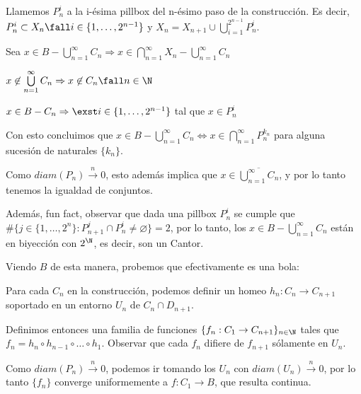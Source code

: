 
Llamemos $P_n^i$ a la i-ésima pillbox del n-ésimo paso de la construcción. Es decir, $P_n^i\subset X_n \fall i\in\{1,\dots,2^{n-1}\}$ y $X_n=X_{n+1}\cup\bigcup\limits_{i=1}^{2^{n-1}}P_n^i$. 
            
Sea $x\in B-\bigcup\limits_{n=1}^\infty C_n \Rightarrow x\in \bigcap\limits_{n=1}^\infty X_n-\bigcup\limits_{n=1}^\infty C_n$ 

$x\not\in\bigcup\limits_{n=1}^\infty C_n \Rightarrow x\not\in C_n\fall n\in\N$ 

$x\in B-C_n\Rightarrow \exst i\in\{1,\dots,2^{n-1}\}$ tal que $x\in P_n^i$ 

Con esto concluimos que $x\in B-\bigcup\limits_{n=1}^\infty C_n \Leftrightarrow x\in\bigcap\limits_{n=1}^\infty P_n^{k_n}$ para alguna sucesión de naturales $\{k_n\}$. 

Como $diam(P_n)\xrightarrow{n} 0$, esto además implica que $x\in\overline{\bigcup\limits_{n=1}^\infty C_n}$, y por lo tanto tenemos la igualdad de conjuntos. 

Además, fun fact, observar que dada una pillbox $P_n^i$ se cumple que $\#\big\{j\in\{1,\dots, 2^n\}:P_{n+1}^j\cap P_n^i\neq\varnothing\big\}=2$, por lo tanto, los $x\in B-\bigcup\limits_{n=1}^\infty C_n$ están en biyección con $2^{\N}$, es decir, son un Cantor. 

Viendo $B$ de esta manera, probemos que efectivamente es una bola: 

Para cada $C_n$ en la construcción, podemos definir un homeo $h_n:C_n\to C_{n+1}$ soportado en un entorno $U_n$ de $C_n\cap D_{n+1}$. 

Definimos entonces una familia de funciones $\{f_n:C_1\to C_{n+1}\}_{n\in\N}$ tales que $f_n=h_n\circ h_{n-1}\circ\dots\circ h_1$. Observar que cada $f_n$ difiere de $f_{n+1}$ sólamente en $U_n$.

Como $diam(P_n)\xrightarrow n 0$, podemos ir tomando los $U_n$ con $diam(U_n)\xrightarrow n 0$, por lo tanto $\{f_n\}$ converge uniformemente a $f:C_1\to B$, que resulta continua. 

